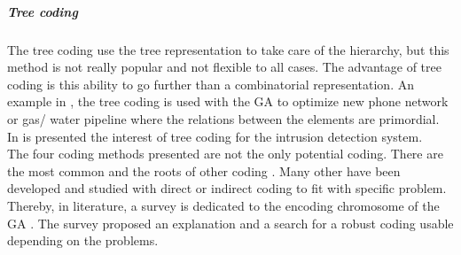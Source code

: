 \subparagraph*{Tree coding }%
The tree coding use the tree representation to take care of the hierarchy, but this method is not really popular and not flexible to all cases. The advantage of tree coding is this ability to go further than a combinatorial representation.  An example in \cite{131*walters1995}, the tree coding is used with the GA to optimize new phone network  or gas/ water pipeline where the relations between the elements are primordial. In \cite{131*walters1995} is presented the interest of tree coding for  the intrusion detection system. 
\\
The four coding methods presented are not the only potential coding. There are the most common and the roots of other coding . Many other have been developed and studied with direct or indirect coding to fit with specific problem. Thereby, in literature, a survey is dedicated to the encoding chromosome of the GA \cite{121*ronald1997}. The survey \cite{121*ronald1997} proposed an explanation and a search for a robust coding usable depending on the problems. 
\\





